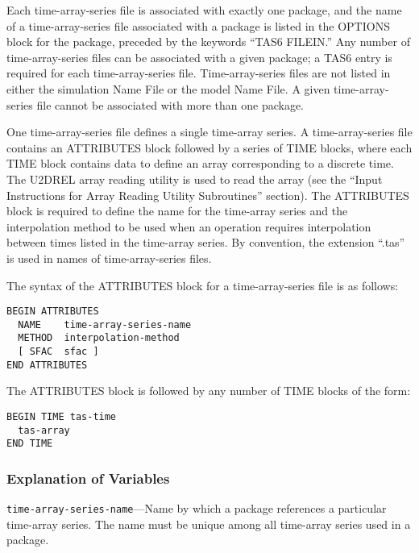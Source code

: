 Each time-array-series file is associated with exactly one package, and the name of a time-array-series file associated with a package is listed in the OPTIONS block for the package, preceded by the keywords ``TAS6 FILEIN.'' Any number of time-array-series files can be associated with a given package; a TAS6 entry is required for each time-array-series file. Time-array-series files are not listed in either the simulation Name File or the model Name File. A given time-array-series file cannot be associated with more than one package.

One time-array-series file defines a single time-array series. A time-array-series file contains an ATTRIBUTES block followed by a series of TIME blocks, where each TIME block contains data to define an array corresponding to a discrete time. The U2DREL array reading utility is used to read the array (see the ``Input Instructions for Array Reading Utility Subroutines'' section). The ATTRIBUTES block is required to define the name for the time-array series and the interpolation method to be used when an operation requires interpolation between times listed in the time-array series.  By convention, the extension ``.tas'' is used in names of time-array-series files.

The syntax of the ATTRIBUTES block for a time-array-series file is as follows:

\begin{lstlisting}[style=blockdefinition]
BEGIN ATTRIBUTES
  NAME    time-array-series-name
  METHOD  interpolation-method
  [ SFAC  sfac ]
END ATTRIBUTES
\end{lstlisting}

The ATTRIBUTES block is followed by any number of TIME blocks of the form:\\
\begin{lstlisting}[style=blockdefinition]
BEGIN TIME tas-time  
  tas-array
END TIME
\end{lstlisting}

\subsubsection{Explanation of Variables}

\begin{description}
\item \texttt{time-array-series-name}---Name by which a package references a particular time-array series. The name must be unique among all time-array series used in a package.
\end{description}

